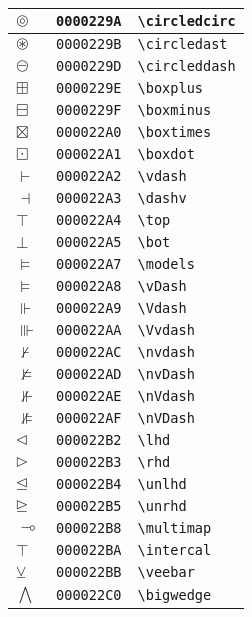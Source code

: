 \begin{longtable}{|l|l|l|}
\hline
$\circledcirc$ & \texttt{0000229A} & \verb|\circledcirc| \\
\hline
$\circledast$ & \texttt{0000229B} & \verb|\circledast| \\
\hline
$\circleddash$ & \texttt{0000229D} & \verb|\circleddash| \\
\hline
$\boxplus$ & \texttt{0000229E} & \verb|\boxplus| \\
\hline
$\boxminus$ & \texttt{0000229F} & \verb|\boxminus| \\
\hline
$\boxtimes$ & \texttt{000022A0} & \verb|\boxtimes| \\
\hline
$\boxdot$ & \texttt{000022A1} & \verb|\boxdot| \\
\hline
$\vdash$ & \texttt{000022A2} & \verb|\vdash| \\
\hline
$\dashv$ & \texttt{000022A3} & \verb|\dashv| \\
\hline
$\top$ & \texttt{000022A4} & \verb|\top| \\
\hline
$\bot$ & \texttt{000022A5} & \verb|\bot| \\
\hline
$\models$ & \texttt{000022A7} & \verb|\models| \\
\hline
$\vDash$ & \texttt{000022A8} & \verb|\vDash| \\
\hline
$\Vdash$ & \texttt{000022A9} & \verb|\Vdash| \\
\hline
$\Vvdash$ & \texttt{000022AA} & \verb|\Vvdash| \\
\hline
$\nvdash$ & \texttt{000022AC} & \verb|\nvdash| \\
\hline
$\nvDash$ & \texttt{000022AD} & \verb|\nvDash| \\
\hline
$\nVdash$ & \texttt{000022AE} & \verb|\nVdash| \\
\hline
$\nVDash$ & \texttt{000022AF} & \verb|\nVDash| \\
\hline
$\lhd$ & \texttt{000022B2} & \verb|\lhd| \\
\hline
$\rhd$ & \texttt{000022B3} & \verb|\rhd| \\
\hline
$\unlhd$ & \texttt{000022B4} & \verb|\unlhd| \\
\hline
$\unrhd$ & \texttt{000022B5} & \verb|\unrhd| \\
\hline
$\multimap$ & \texttt{000022B8} & \verb|\multimap| \\
\hline
$\intercal$ & \texttt{000022BA} & \verb|\intercal| \\
\hline
$\veebar$ & \texttt{000022BB} & \verb|\veebar| \\
\hline
$\bigwedge$ & \texttt{000022C0} & \verb|\bigwedge| \\

\end{longtable}
